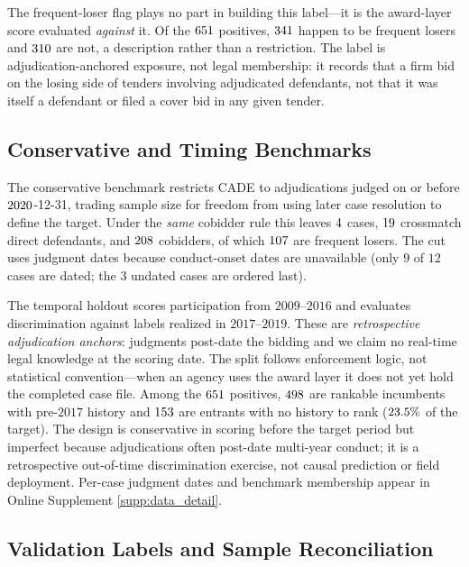 The frequent-loser flag plays no part in building this label---it is the
award-layer score evaluated \emph{against} it. Of the
$651$ positives, $341$ happen to be frequent
losers and $310$ are not, a description rather than a
restriction. The label is adjudication-anchored exposure, not legal
membership: it records that a firm bid on the losing side of tenders
involving adjudicated defendants, not that it was itself a defendant or
filed a cover bid in any given tender.

\subsection{Conservative and Timing Benchmarks}
\label{app:conservative_timing_submission}

The conservative benchmark restricts CADE to adjudications judged on
or before $2020$-12-31, trading sample size for
freedom from using later case resolution to define the target. Under
the \emph{same} cobidder rule this leaves $4$
cases, $19$ crossmatch direct defendants, and
$208$ cobidders, of which $107$
are frequent losers. The cut uses judgment dates because conduct-onset
dates are unavailable (only $9$ of $12$ cases are dated; the $3$
undated cases are ordered last).

The temporal holdout scores participation from $2009$--$2016$ and
evaluates discrimination against labels realized in $2017$--$2019$.
These are \emph{retrospective adjudication anchors}: judgments
post-date the bidding and we claim no real-time legal knowledge at the
scoring date. The split follows enforcement logic, not statistical
convention---when an agency uses the award layer it does not yet hold
the completed case file. Among the $651$ positives,
$498$ are rankable incumbents with pre-$2017$ history
and $153$ are entrants with no history to rank
($23.5\%$ of the target). The design is conservative in
scoring before the target period but imperfect because adjudications
often post-date multi-year conduct; it is a retrospective out-of-time
discrimination exercise, not causal prediction or field deployment.
Per-case judgment dates and benchmark membership appear in Online
Supplement \ref{supp:data_detail}.

\subsection{Validation Labels and Sample Reconciliation}
\label{app:reconciliation_submission}

